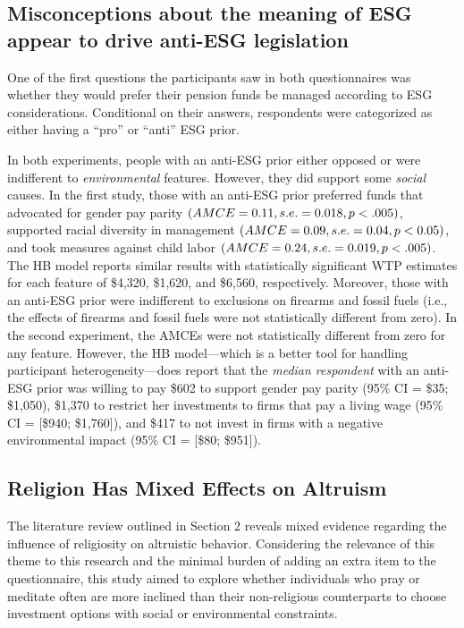 \documentclass[
  12pt,
]{article}
\begin{document}
\hypertarget{misconceptions-about-the-meaning-of-esg-appear-to-drive-anti-esg-legislation}{%
\subsection{Misconceptions about the meaning of ESG appear to drive anti-ESG legislation}\label{misconceptions-about-the-meaning-of-esg-appear-to-drive-anti-esg-legislation}}

One of the first questions the participants saw in both questionnaires was whether they would prefer their pension funds be managed according to ESG considerations. Conditional on their answers, respondents were categorized as either having a ``pro'' or ``anti'' ESG prior.

In both experiments, people with an anti-ESG prior either opposed or were indifferent to \emph{environmental} features. However, they did support some \emph{social} causes. In the first study, those with an anti-ESG prior preferred funds that advocated for gender pay parity \((AMCE = 0.11, \space s.e.=0.018, \space p <.005)\), supported racial diversity in management \((AMCE = 0.09, \space s.e.=0.04, \space p <0.05)\), and took measures against child labor \((AMCE = 0.24, \space s.e.=0.019, \space p <.005)\). The HB model reports similar results with statistically significant WTP estimates for each feature of \$4,320, \$1,620, and \$6,560, respectively. Moreover, those with an anti-ESG prior were indifferent to exclusions on firearms and fossil fuels (i.e., the effects of firearms and fossil fuels were not statistically different from zero). In the second experiment, the AMCEs were not statistically different from zero for any feature. However, the HB model---which is a better tool for handling participant heterogeneity---does report that the \emph{median respondent} with an anti-ESG prior was willing to pay \$602 to support gender pay parity (95\% CI = \$35; \$1,050), \$1,370 to restrict her investments to firms that pay a living wage (95\% CI = {[}\$940; \$1,760{]}), and \$417 to not invest in firms with a negative environmental impact (95\% CI = {[}\$80; \$951{]}).

\hypertarget{religion-has-mixed-effects-on-altruism}{%
\subsection{Religion Has Mixed Effects on Altruism}\label{religion-has-mixed-effects-on-altruism}}

The literature review outlined in Section 2 reveals mixed evidence regarding the influence of religiosity on altruistic behavior. Considering the relevance of this theme to this research and the minimal burden of adding an extra item to the questionnaire, this study aimed to explore whether individuals who pray or meditate often are more inclined than their non-religious counterparts to choose investment options with social or environmental constraints.
\end{document}
